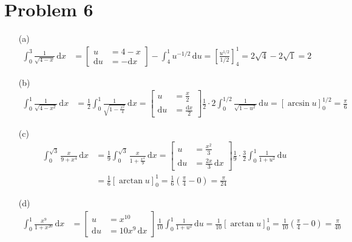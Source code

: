 \documentclass[preview, margin=0.6in]{standalone}
\newcommand*{\problem}[1]{\section*{Problem #1}}
\begin{document}
\problem{6}
\begin{itemize}
	\item[(a)]
	\begin{align*}
	    \int_{0}^{3}\frac{1}{\sqrt{4-x}}\,\mathrm{d}x
		&=\left[ \begin{aligned}
			u&=4-x \\ 
			\mathrm{d}u&=-\mathrm{d}x
		\end{aligned} \right]
		-\int_{4}^{1}u^{-1/2}\,\mathrm{d}u
		=\left[\frac{u^{1/2}}{1/2}\right]_{4}^{1}
		=2 \sqrt{4}-2 \sqrt{1}
		=\boxed{2}
	\end{align*}

	\item[(b)]
	\begin{align*}
	    \int_{0}^{1}\frac{1}{\sqrt{4-x^2}}\,\mathrm{d}x
		&=\frac12 \int_{0}^{1}\frac{1}{\sqrt{1-\frac{x^2}{4}}}\,\mathrm{d}x
		=\left[ \begin{aligned}
			u&=\frac{x}{2} \\
			\mathrm{d}u&=\frac{\mathrm{d}x}{2}
		\end{aligned} \right]
		\frac12\cdot2 \int_{0}^{1/2}\frac{1}{\sqrt{1-u^2}}\,\mathrm{d}u =\left[\arcsin u\right]_{0}^{1/2}
		=\boxed{\frac{\pi}{6}}
	\end{align*}

	\item[(c)]
	\begin{align*}
	    \int_{0}^{\sqrt{3}}\frac{x}{9+x^4}\,\mathrm{d}x
		&=\frac19\int_{0}^{\sqrt{3}}\frac{x}{1+\frac{x^4}{9}}\,\mathrm{d}x
		=\left[ \begin{aligned}
			u&=\frac{x^2}{3} \\
			\mathrm{d}u&=\frac{2x}{3}\,\mathrm{d}x
		\end{aligned} \right]
		\frac19\cdot \frac{3}{2}\int_{0}^{1}\frac{1}{1+u^2}\,\mathrm{d}u \\
		&=\frac16 \left[\arctan u\right]_{0}^{1}
		=\frac16 \left(\frac{\pi}{4}-0\right)
		=\boxed{\frac{\pi}{24}}
	\end{align*}

	\item[(d)]
	\begin{align*}
		\int_{0}^{1}\frac{x^9}{1+x^{20}}\,\mathrm{d}x
		&=\left[\begin{aligned}
			u&=x^{10} \\
			\mathrm{d}u&=10x^9 \,\mathrm{d}x
		\end{aligned}\right]
		\frac{1}{10}\int_{0}^{1}\frac{1}{1+u^2}\,\mathrm{d}u
		=\frac{1}{10}\left[\arctan u\right]_{0}^{1}
		=\frac{1}{10}\left(\frac{\pi}{4}-0\right)
		=\boxed{\frac{\pi}{40}}
	\end{align*}


\end{itemize}
\end{document}
